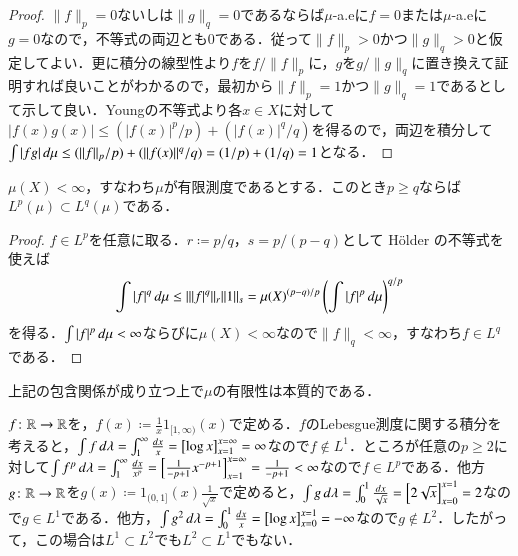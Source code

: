 \begin{proof}
$\|f\|_p =0$ないしは$\|g\|_q =0$であるならば$\mu$-a.eに$f=0$または$\mu$-a.eに$g=0$なので，不等式の両辺とも0である．従って$\|f\|_p > 0$かつ$\|g\|_q > 0$と仮定してよい．更に積分の線型性より$f$を$f/\|f\|_p$に，$g$を$g/\|g\|_q$に置き換えて証明すれば良いことがわかるので，最初から$\|f\|_p=1$かつ$\|g\|_q=1$であるとして示して良い．Youngの不等式より各$x \in X$に対して$|f(x)g(x)| \leq (|f(x)|^p/p) + (|f(x)|^q/q)$を得るので，両辺を積分して$\int |fg| \mathop{}\!d \mu \leq (\|f\|_p/p) + (\|f(x)\|^q/q) = (1/p) + (1/q) = 1$となる．
\end{proof}

\begin{prop}
$\mu(X) < \infty$，すなわち$\mu$が有限測度であるとする．このとき$p \geq q$ならば$L^p(\mu) \subset L^q(\mu)$である．
\end{prop}

\begin{proof}
$f \in L^p$を任意に取る．$r\coloneqq  p/q$，$s = p/(p-q)$として H\"older の不等式を使えば
\begin{equation}
\int |f|^q \mathop{}\!d \mu \leq \||f|^q\|_r \|1\|_s =\mu(X)^{(p-q)/p}\left(\int |f|^p \mathop{}\!d \mu \right)^{q/p}
\end{equation}を得る．$\int |f|^p \mathop{}\!d\mu < \infty$ならびに$\mu(X) < \infty$なので$\|f\|_q < \infty$，すなわち$f \in L^q$である．
\end{proof}

上記の包含関係が成り立つ上で$\mu$の有限性は本質的である．

\begin{exm}
$f \colon \mathbb{R} \to \mathbb{R}$を，$f(x) \coloneqq \frac{1}{x}1_{[1,\infty)}(x)$で定める．$f$のLebesgue測度に関する積分を考えると，$\int f \mathop{}\!d\lambda = \int_1^\infty \frac{\mathop{}\!d x}{x} = \left[ \log x \right]_{x=1}^{x=\infty} = \infty$なので$f \notin L^1$．ところが任意の$p \geq 2$に対して$\int f^p \mathop{}\!d \lambda = \int_1^\infty \frac{\mathop{}\!d x}{x^p} = \left[ \frac{1}{-p+1}x^{-p+1} \right]_{x=1}^{x=\infty} = \frac{1}{-p+1} < \infty$なので$f \in L^p$である．他方$g \colon \mathbb{R} \to \mathbb{R}$を$g(x) \coloneqq 1_{(0,1]}(x) \frac{1}{\sqrt{x}}$で定めると，$\int g \mathop{}\!d \lambda = \int_0^1 \frac{\mathop{}\!d x}{\sqrt{x}} = \left[ 2 \sqrt{x} \right]_{x=0}^{x=1} = 2$なので$g \in L^1$である．他方，$\int g^2 \mathop{}\!d \lambda = \int_0^1 \frac{\mathop{}\!d x}{x} = \left[ \log x \right]_{x=0}^{x=1} = -\infty$なので$g \notin L^2$．したがって，この場合は$L^1 \subset L^2$でも$L^2 \subset L^1$でもない．
\end{exm}

